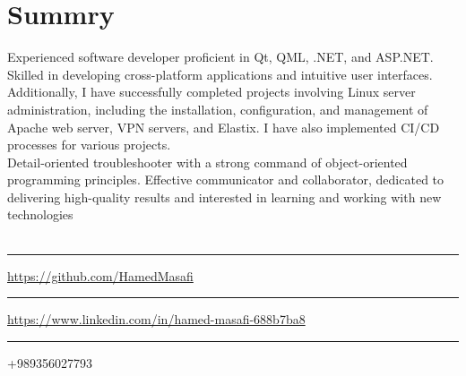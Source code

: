 \section{Summry}
Experienced software developer proficient in Qt, QML, .NET, and ASP.NET. Skilled in developing cross-platform applications and intuitive user interfaces. Additionally, I have successfully completed projects involving Linux server administration, including the installation, configuration, and management of Apache web server, VPN servers, and Elastix. I have also implemented CI/CD processes for various projects.
\\
Detail-oriented troubleshooter with a strong command of object-oriented programming principles. Effective communicator and collaborator, dedicated to delivering high-quality results and interested in learning and working with new technologies
\\
\\
\faGithub\rule{0.5cm}{0pt}\url{https://github.com/HamedMasafi}
\\
\faLinkedin\rule{0.5cm}{0pt}\url{https://www.linkedin.com/in/hamed-masafi-688b7ba8}
\\
\faPhone\rule{0.5cm}{0pt}+989356027793
